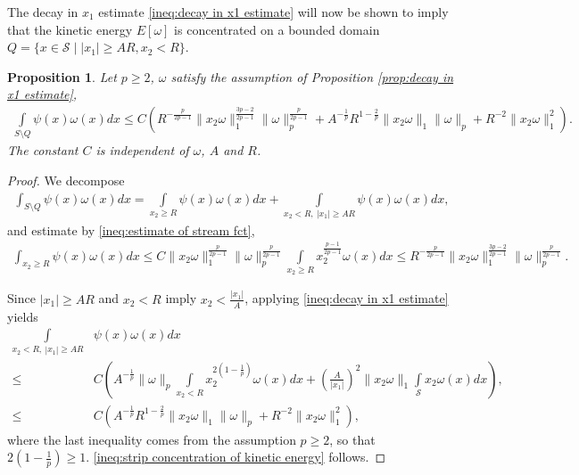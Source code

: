 \documentclass[11pt,letterpaper]{amsart}
\newtheorem{prop}[thm]{Proposition}
\theoremstyle{definition}
\theoremstyle{remark}
\renewcommand{\S}{\mathcal{S}}
\numberwithin{equation}{section}
\begin{document}
The decay in $x_1$ estimate \eqref{ineq:decay in x1 estimate} will now be shown to imply that the kinetic energy $E[\omega]$ is concentrated on a bounded domain $Q=\{x \in \S \mid |x_1|\geq AR, x_2<R \}$.
\begin{prop}\label{prop:strip concentration of kinetic energy}
    Let $p\geq 2$, $\omega$ satisfy the assumption of Proposition \ref{prop:decay in x1 estimate},
    \begin{align}
        \int\limits_{S\setminus Q} \psi(x)\omega(x) dx\leq  C\left(R^{-\frac{p}{2p-1}}\|x_2\omega\|_1^{\frac{3p-2}{2p-1}}\|\omega\|_p^{\frac{p}{2p-1}} + A^{-\frac{1}{p}} R^{1-\frac{2}{p}} \|x_2\omega\|_1 \|\omega\|_p + R^{-2} \|x_2\omega\|_1^2 \right). \label{ineq:strip concentration of kinetic energy}
    \end{align}
    The constant $C$ is independent of $\omega$, $A$ and $R$.
\end{prop}
\begin{proof}
We decompose 
\begin{align*}
    \int_{S\setminus Q} \psi(x)\omega(x) dx = \int\limits_{x_2 \geq R} \psi(x)\omega(x) dx + \int\limits_{x_2 < R, \ |x_1|\geq AR} \psi(x)\omega(x) dx,
\end{align*}
and estimate by \eqref{ineq:estimate of stream fct},
\begin{align*}
    \int_{x_2 \geq R} \psi(x)\omega(x) dx \leq C \|x_2\omega\|_1^{\frac{p}{2p-1}}\|\omega\|_p^{\frac{p}{2p-1}} \int\limits_{x_2\geq R} x_2^{\frac{p-1}{2p-1}}\omega(x) dx \leq R^{-\frac{p}{2p-1}}\|x_2\omega\|_1^{\frac{3p-2}{2p-1}}\|\omega\|_p^{\frac{p}{2p-1}}.
\end{align*}

Since $|x_1|\geq AR$ and $x_2 < R$ imply $x_2 < \frac{|x_1|}{A}$, applying \eqref{ineq:decay in x1 estimate} yields
\begin{align*}
    \int\limits_{x_2 < R, \ |x_1|\geq AR} &  \psi(x)\omega(x) dx \\
    \leq & C\left( A^{-\frac{1}{p}}\|\omega\|_p \int\limits_{x_2 < R} x_2^{2(1-\frac{1}{p})}\omega(x) dx  +  \left( \frac{A}{|x_1|} \right)^2 \|x_2\omega\|_1 \int\limits_{\S} x_2\omega(x)dx \right), \\
    \leq & C\left( A^{-\frac{1}{p}} R^{1-\frac{2}{p}} \|x_2\omega\|_1 \|\omega\|_p + R^{-2} \|x_2\omega\|_1^2 \right),
\end{align*}
where the last inequality comes from the assumption $p\geq 2$, so that $2(1-\frac{1}{p})\geq 1$. \eqref{ineq:strip concentration of kinetic energy} follows.
    
\end{proof}
\end{document}
